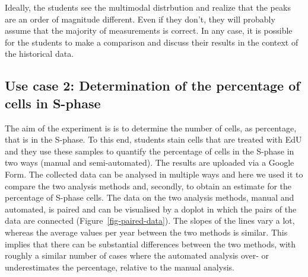 \documentclass[
]{agujournal2019}
\begin{document}
Ideally, the students see the multimodal distrbution and realize that
the peaks are an order of magnitude different. Even if they don't, they
will probably assume that the majority of measurements is correct. In
any case, it is possible for the students to make a comparison and
discuss their results in the context of the historical data.

\hypertarget{use-case-2-determination-of-the-percentage-of-cells-in-s-phase}{%
\subsection*{Use case 2: Determination of the percentage of cells in
S-phase}\label{use-case-2-determination-of-the-percentage-of-cells-in-s-phase}}

The aim of the experiment is is to determine the number of cells, as
percentage, that is in the S-phase. To this end, students stain cells
that are treated with EdU and they use these samples to quantify the
percentage of cells in the S-phase in two ways (manual and
semi-automated). The results are uploaded via a Google Form. The
collected data can be analysed in multiple ways and here we used it to
compare the two analysis methods and, secondly, to obtain an estimate
for the percentage of S-phase cells. The data on the two analysis
methods, manual and automated, is paired and can be visualised by a
doplot in which the pairs of the data are connected
(Figure~\ref{fig-paired-data}). The slopes of the lines vary a lot,
whereas the average values per year between the two methods is similar.
This implies that there can be substantial differences between the two
methods, with roughly a similar number of cases where the automated
analysis over- or underestimates the percentage, relative to the manual
analysis.
\end{document}
